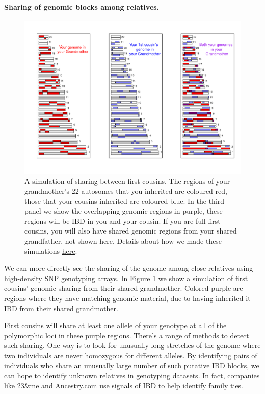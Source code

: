 \paragraph{Sharing of genomic blocks among relatives.}
\begin{figure}
\begin{center}
\includegraphics[width= \textwidth]{figures/sharing_relatives/First_cousin_overlap.pdf}
\end{center}
\caption[]{A simulation of sharing between first cousins. The regions of your grandmother's 22 autosomes that you inherited are
coloured red, those that your cousins inherited are coloured blue. In the third panel we show the overlapping genomic regions in purple, these regions will be IBD in you and your cousin. If you are full first cousins, you will also have shared genomic regions from your shared grandfather, not shown here. Details about how we made these simulations \href{https://gcbias.org/2013/12/02/how-many-genomic-blocks-do-you-share-with-a-cousin/}{here}.
} \label{fig:first_cousin_IBD}
\end{figure}
We can more directly see the sharing of the genome among close
relatives using high-density SNP genotyping arrays. In Figure
\ref{fig:first_cousin_IBD} we show a simulation of first cousins'
genomic sharing from their shared grandmother. Colored purple are
regions where they have matching genomic material, due to having
inherited it IBD from their shared grandmother.


First cousins will share at least one allele of your genotype at all of the polymorphic loci in these purple regions. There's a range of methods to detect such sharing. One way is to look for unusually long stretches of the genome where two individuals are never homozygous for different alleles. By identifying pairs of individuals who share an unusually large number of such putative IBD blocks, we can hope to identify unknown relatives in genotyping datasets. In fact, companies like 23\&me and Ancestry.com use signals of IBD to help identify family ties.

